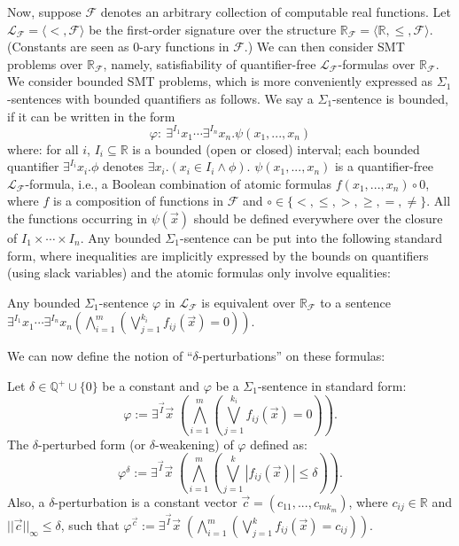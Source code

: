 \documentclass[envcountsect]{llncs}
\begin{document}
Now, suppose $\mathcal{F}$ denotes an arbitrary collection of computable real
functions. Let $\mathcal{L}_{\mathcal{F}} = \langle <,
\mathcal{F}\rangle$ be the first-order signature over the structure
$\mathbb{R}_{\mathcal{F}} = \langle
\mathbb{R}, \leq, \mathcal{F}\rangle$. (Constants are seen as 0-ary
functions in $\mathcal{F}$.) We can then consider SMT problems
over $\mathbb{R}_{\mathcal{F}}$, namely, satisfiability of quantifier-free
$\mathcal{L}_{\mathcal{F}}$-formulas over $\mathbb{R}_{\mathcal{F}}$. We
consider bounded SMT problems, which is more conveniently expressed as
$\Sigma_1$-sentences with bounded quantifiers as follows. We say a
$\Sigma_1$-sentence is bounded, if it can be written in the form
$$\varphi:\ \exists^{I_1}x_1\cdots \exists^{I_n}x_n. \psi(x_1,...,x_n)$$
where: for all $i$, $I_i\subseteq \mathbb{R}$ is a bounded (open or closed)
interval; each bounded quantifier $\exists^{I_i}x_i.\phi$ denotes $\exists
x_i.(x_i\in I_i\wedge \phi)$. $\psi(x_1,...,x_n)$ is a quantifier-free
$\mathcal{L}_{\mathcal{F}}$-formula, i.e., a Boolean combination of atomic
formulas $f(x_1,...,x_n)\circ 0$, where $f$ is a composition of
functions in $\mathcal{F}$ and $\circ\in\{<,\leq, >, \geq, =, \neq \}$.
All the functions occurring in $\psi(\vec x)$ should be defined everywhere over
the closure of $I_1\times\cdots \times I_n$. Any bounded $\Sigma_1$-sentence
can be put into the following standard form, where inequalities are implicitly
expressed by the bounds on quantifiers (using slack variables) and the
atomic formulas only involve equalities:
\begin{proposition}\label{pre1}
Any bounded $\Sigma_1$-sentence $\varphi$ in $\mathcal{L}_{\mathcal{F}}$ is
equivalent over $\mathbb{R}_{\mathcal{F}}$ to a sentence $\exists^{I_1}x_1\cdots
\exists^{I_n}x_n(\bigwedge_{i=1}^m(\bigvee_{j=1}^{k_i}
f_{ij}(\vec x)=0)).$
\end{proposition}
We can now define the notion of ``$\delta$-perturbations'' on these
formulas:
\begin{definition}\label{weak-def}
Let $\delta\in \mathbb{Q}^+\cup\{0\}$ be a constant and $\varphi$ be a
$\Sigma_1$-sentence in standard form:
\[\varphi:= \exists^{\vec I}\vec x\;(\bigwedge_{i=1}^m (\bigvee_{j=1}^{k_i}
f_{ij}(\vec x)= 0)).
\]
The $\delta$-perturbed form (or $\delta$-weakening) of $\varphi$ defined as:
\[\varphi^{\delta}:= \exists^{\vec I} \vec x\;(\bigwedge_{i=1}^m(\bigvee_{j=1}^k
|f_{ij}(\vec x)|\leq \delta)).\]
Also, a $\delta$-perturbation is a constant vector $\vec c =
(c_{11},...,c_{mk_m})$, where $c_{ij}\in\mathbb{R}$ and $||\vec
c||_{\infty}\leq\delta$, such that $\varphi^{\vec c}:= \exists^{\vec I} \vec
x\;(\bigwedge_{i=1}^m(\bigvee_{j=1}^k
f_{ij}(\vec x) = c_{ij})).$
\end{definition}
\end{document}
